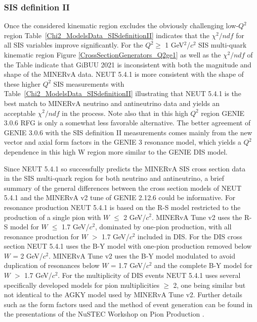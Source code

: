 \documentclass[aps, prd, twocolumn, showpacs, superscriptaddress, floatfix]{revtex4-2}
\begin{document}
\subsubsection{SIS definition II}
Once the considered kinematic region excludes the obviously challenging low-$Q^2$ region Table~\ref{Chi2_ModelsData_SISdefinitionII} indicates that the $\chi^2/ndf$ for all SIS variables improve significantly. For the $Q^2 \geq$ 1 GeV$^2$/$c^2$ SIS multi-quark kinematic region Figure \ref{CrossSectionGenerators_Q2ge1} as well as the $\chi^2/ndf$ of the Table indicate that GiBUU 2021 is inconsistent with both the magnitude and shape of the MINERvA data. NEUT 5.4.1 is more consistent with the shape of these higher $Q^2$ SIS measurements with Table~\ref{Chi2_ModelsData_SISdefinitionII} illustrating that NEUT 5.4.1 is the best match to MINERvA neutrino and antineutrino data and yields an acceptable $\chi^2/ndf$ in the process. Note also that in this high $Q^2$ region GENIE 3.0.6 RFG is only a somewhat less favorable alternative. The better agreement of GENIE 3.0.6 with the SIS definition II measurements comes mainly \cite{GENIE:2022qrc} from the new vector and axial form factors in the GENIE 3 resonance model, which yields a $Q^2$ dependence in this high W region more similar to the GENIE DIS model.

Since NEUT 5.4.1 so successfully predicts the MINERvA SIS cross section data in the SIS multi-quark region for both neutrino and antineutrino, a brief summary of the general differences between the cross section models of NEUT 5.4.1 and the MINERvA v2 tune of GENIE 2.12.6 could be informative. For resonance production NEUT 5.4.1 is based on the R-S model restricted to the production of a single pion with $W$ $\leq$ 2 GeV/$c^2$. MINERvA Tune v2 uses the R-S model for $W$ $\leq$ 1.7 GeV/$c^2$, dominated by one-pion production, with all resonance production for $W$ $>$ 1.7 GeV/$c^2$ included in DIS. For the DIS cross section NEUT 5.4.1 uses the B-Y model with one-pion production removed below $W$ = 2 GeV/$c^2$. MINERvA Tune v2 uses the B-Y model modulated to avoid duplication of resonances below $W$ = 1.7 GeV/$c^2$ and the complete B-Y model for $W$ $>$ 1.7 GeV/$c^2$. For the multiplicity of DIS events NEUT 5.4.1 uses several specifically developed models for pion multiplicities $\geq$ 2, one being similar but not identical to the AGKY model used by MINERvA Tune v2. Further details such as the form factors used and the method of event generation can be found in the presentations of the NuSTEC Workshop on Pion Production \cite{NuSTEC:2020nsl}.
\end{document}
